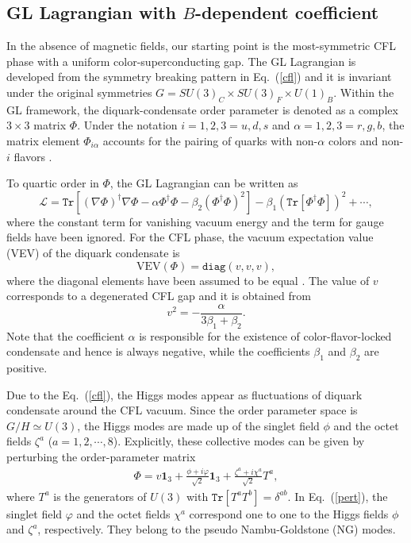 \documentclass[prd, showpacs,nofootinbib,amsmath,amssymb]{revtex4}
\begin{document}
\subsection{GL Lagrangian with $B$-dependent coefficient}
\label{sssec:1}
%

In the absence of magnetic fields, our starting point is the most-symmetric CFL phase with a uniform
color-superconducting gap. The GL Lagrangian is developed from the symmetry breaking pattern in Eq.~(\ref{cfl}) and it is invariant
under the original symmetries $G=SU(3)_C \times SU(3)_F\times U(1)_B$. Within the GL framework, the
diquark-condensate order parameter is denoted as a complex $3\times3$ matrix $\Phi$. Under the notation
$i = 1, 2, 3 = u, d, s$ and $\alpha = 1, 2, 3 = r, g, b$, the matrix element $\Phi_{i \alpha}$ accounts
for the pairing of quarks with non-$\alpha$ colors and non-$i$ flavors \cite{iida2002superfluid}.

To quartic order in $\Phi$, the GL Lagrangian can be written as~\cite{iida2002superfluid,giannakis2002ginzburg}
\begin{equation}
\mathcal{L}=
\texttt{Tr}\left[(\nabla\Phi)^\dagger\nabla\Phi
  -\alpha\Phi^\dagger\Phi -\beta_2(\Phi^\dagger\Phi)^2\right]
-\beta_1(\texttt{Tr}[\Phi^\dagger\Phi])^2 +\cdots ,\label{gl}
\end{equation}
where the constant term for vanishing vacuum energy and the term for gauge fields have been
ignored. For the CFL phase, the vacuum expectation value (VEV) of the diquark condensate is
\begin{equation}
  \text{VEV}(\Phi)=\texttt{diag}(v,v,v) ,\label{cflground}
\end{equation}
where the diagonal elements have been assumed to be equal \cite{iida2002superfluid}. The value of
$v$ corresponds to a degenerated CFL gap and it is obtained from
\begin{equation}
  \label{eq:dvaccum}
v^2 = -\frac{\alpha}{3\beta_1+\beta_2}.
\end{equation}
Note that the coefficient $\alpha$ is responsible for the existence of color-flavor-locked condensate
and hence is always negative, while the coefficients $\beta_1$ and $\beta_2$ are positive.

Due to the Eq.~(\ref{cfl}), the Higgs modes appear as fluctuations of diquark condensate around the
CFL vacuum. Since the order parameter space is $G/H \simeq U(3)$, the Higgs modes are made up of the
singlet field $\phi$ and the octet fields $\zeta^a$ ($a = 1, 2, \cdots, 8$). Explicitly, these
collective modes can be given by perturbing the order-parameter matrix
\begin{eqnarray}
\Phi=v\textbf{1}_3+\frac{\phi+i\varphi}{\sqrt{2}}\textbf{1}_3+\frac{\zeta^a+i\chi^a}{\sqrt{2}}T^a,
\label{pert}
\end{eqnarray}
where $T^a$ is the generators of $U(3)$ with $\texttt{Tr}[T^a T^b]=\delta^{ab}$.
In Eq.~(\ref{pert}), the singlet field $\varphi$ and the octet fields $\chi^a$ correspond one to
one to the Higgs fields $\phi$ and $\zeta^a$, respectively. They belong to the pseudo Nambu-Goldstone
(NG) modes.
\end{document}
